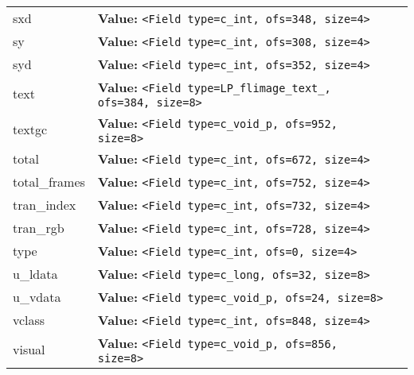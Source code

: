 \begin{longtable}{|p{\varnamewidth}|p{\vardescrwidth}|l}
\cline{1-2}
\raggedright s\-x\-d\- & \raggedright \textbf{Value:} 
{\tt {\textless}Field type=c\_int, ofs=348, size=4{\textgreater}}&\\
\cline{1-2}
\raggedright s\-y\- & \raggedright \textbf{Value:} 
{\tt {\textless}Field type=c\_int, ofs=308, size=4{\textgreater}}&\\
\cline{1-2}
\raggedright s\-y\-d\- & \raggedright \textbf{Value:} 
{\tt {\textless}Field type=c\_int, ofs=352, size=4{\textgreater}}&\\
\cline{1-2}
\raggedright t\-e\-x\-t\- & \raggedright \textbf{Value:} 
{\tt {\textless}Field type=LP\_flimage\_text\_, ofs=384, size=8{\textgreater}}&\\
\cline{1-2}
\raggedright t\-e\-x\-t\-g\-c\- & \raggedright \textbf{Value:} 
{\tt {\textless}Field type=c\_void\_p, ofs=952, size=8{\textgreater}}&\\
\cline{1-2}
\raggedright t\-o\-t\-a\-l\- & \raggedright \textbf{Value:} 
{\tt {\textless}Field type=c\_int, ofs=672, size=4{\textgreater}}&\\
\cline{1-2}
\raggedright t\-o\-t\-a\-l\-\_\-f\-r\-a\-m\-e\-s\- & \raggedright \textbf{Value:} 
{\tt {\textless}Field type=c\_int, ofs=752, size=4{\textgreater}}&\\
\cline{1-2}
\raggedright t\-r\-a\-n\-\_\-i\-n\-d\-e\-x\- & \raggedright \textbf{Value:} 
{\tt {\textless}Field type=c\_int, ofs=732, size=4{\textgreater}}&\\
\cline{1-2}
\raggedright t\-r\-a\-n\-\_\-r\-g\-b\- & \raggedright \textbf{Value:} 
{\tt {\textless}Field type=c\_int, ofs=728, size=4{\textgreater}}&\\
\cline{1-2}
\raggedright t\-y\-p\-e\- & \raggedright \textbf{Value:} 
{\tt {\textless}Field type=c\_int, ofs=0, size=4{\textgreater}}&\\
\cline{1-2}
\raggedright u\-\_\-l\-d\-a\-t\-a\- & \raggedright \textbf{Value:} 
{\tt {\textless}Field type=c\_long, ofs=32, size=8{\textgreater}}&\\
\cline{1-2}
\raggedright u\-\_\-v\-d\-a\-t\-a\- & \raggedright \textbf{Value:} 
{\tt {\textless}Field type=c\_void\_p, ofs=24, size=8{\textgreater}}&\\
\cline{1-2}
\raggedright v\-c\-l\-a\-s\-s\- & \raggedright \textbf{Value:} 
{\tt {\textless}Field type=c\_int, ofs=848, size=4{\textgreater}}&\\
\cline{1-2}
\raggedright v\-i\-s\-u\-a\-l\- & \raggedright \textbf{Value:} 
{\tt {\textless}Field type=c\_void\_p, ofs=856, size=8{\textgreater}}&\\

\end{longtable}
